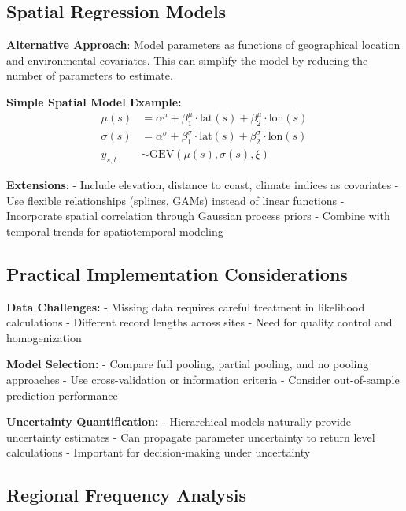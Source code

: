 \documentclass[
  letterpaper,
  DIV=11,
  numbers=noendperiod]{scrreprt}
\begin{document}
\subsection{Spatial Regression Models}\label{spatial-regression-models}

\textbf{Alternative Approach}: Model parameters as functions of
geographical location and environmental covariates. This can simplify
the model by reducing the number of parameters to estimate.

\textbf{Simple Spatial Model Example:} \[
\begin{aligned}
    \mu(s) &= \alpha^\mu + \beta^\mu_1 \cdot \text{lat}(s) + \beta^\mu_2 \cdot \text{lon}(s) \\
    \sigma(s) &= \alpha^\sigma + \beta^\sigma_1 \cdot \text{lat}(s) + \beta^\sigma_2 \cdot \text{lon}(s) \\
    y_{s,t} &\sim \text{GEV}(\mu(s), \sigma(s), \xi)
\end{aligned}
\]

\textbf{Extensions}: - Include elevation, distance to coast, climate
indices as covariates - Use flexible relationships (splines, GAMs)
instead of linear functions - Incorporate spatial correlation through
Gaussian process priors - Combine with temporal trends for
spatiotemporal modeling

\subsection{Practical Implementation
Considerations}\label{practical-implementation-considerations}

\textbf{Data Challenges:} - Missing data requires careful treatment in
likelihood calculations - Different record lengths across sites - Need
for quality control and homogenization

\textbf{Model Selection:} - Compare full pooling, partial pooling, and
no pooling approaches - Use cross-validation or information criteria -
Consider out-of-sample prediction performance

\textbf{Uncertainty Quantification:} - Hierarchical models naturally
provide uncertainty estimates - Can propagate parameter uncertainty to
return level calculations - Important for decision-making under
uncertainty

\subsection{Regional Frequency
Analysis}\label{regional-frequency-analysis}
\end{document}
